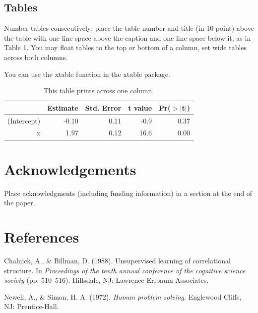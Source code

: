 \documentclass[10pt, letterpaper]{article}
\begin{document}
\subsection{Tables}\label{tables}

Number tables consecutively; place the table number and title (in 10
point) above the table with one line space above the caption and one
line space below it, as in Table 1. You may float tables to the top or
bottom of a column, set wide tables across both columns.

You can use the xtable function in the xtable package.

\begin{table}[H]
\centering
\begin{tabular}{rrrrr}
  \hline
 & Estimate & Std. Error & t value & Pr($>$$|$t$|$) \\ 
  \hline
(Intercept) & -0.10 & 0.11 & -0.9 & 0.37 \\ 
  x & 1.97 & 0.12 & 16.6 & 0.00 \\ 
   \hline
\end{tabular}
\caption{This table prints across one column.} 
\end{table}

\section{Acknowledgements}\label{acknowledgements}

Place acknowledgments (including funding information) in a section at
the end of the paper.

\section{References}\label{references}

\setlength{\parindent}{-0.1in} \setlength{\leftskip}{0.125in} \noindent

\hypertarget{refs}{}
\hypertarget{ref-ChalnickBillman1988a}{}
Chalnick, A., \& Billman, D. (1988). Unsupervised learning of
correlational structure. In \emph{Proceedings of the tenth annual
conference of the cognitive science society} (pp. 510--516). Hillsdale,
NJ: Lawrence Erlbaum Associates.

\hypertarget{ref-NewellSimon1972a}{}
Newell, A., \& Simon, H. A. (1972). \emph{Human problem solving}.
Englewood Cliffs, NJ: Prentice-Hall.
\end{document}
